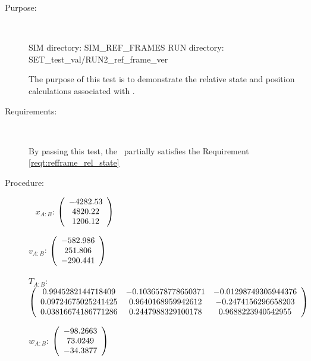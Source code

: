 \label{test:refframe_test_5}
\begin{description}
\item[Purpose:] \ \newline

SIM directory: SIM\_REF\_FRAMES
RUN directory: SET\_test\_val/RUN2\_ref\_frame\_ver

The purpose of this test is to demonstrate the relative state and
position calculations associated with .

\item[Requirements:] \ \newline

By passing this test, the \ partially satisfies
the Requirement \ref{reqt:refframe_rel_state}

\item[Procedure:] \ \newline
$x_{A:B}$:  $\left( \begin{array} {ccc}  -4282.53 \\    4820.22 \\    1206.12
\end{array} \right)\\ \\$

$v_{A:B}$:   $\left( \begin{array} {ccc}  -582.986 \\    251.806 \\   -290.441
\end{array} \right)\\ \\$

$T_{A:B}$:   $\left( \begin{array} {ccc}
0.9945282144718409 & -0.1036578778650371 & -0.01298749305944376 \\
0.09724675025241425 & 0.9640168959942612 & -0.2474156296658203 \\
0.03816674186771286 & 0.2447988329100178 & 0.9688223940542955
\end{array} \right)\\ \\$

$w_{A:B}$:   $\left( \begin{array} {ccc}  -98.2663 \\    73.0249 \\   -34.3877
\end{array} \right)\\ \\$


\end{description}
